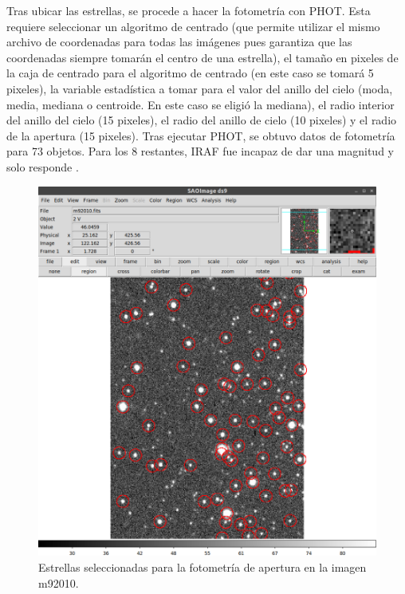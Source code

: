 \documentclass[12pt]{article}
\begin{document}
Tras ubicar las estrellas, se procede a hacer la fotometría con PHOT.
Esta requiere seleccionar un algoritmo de centrado (que permite utilizar el mismo archivo de coordenadas para todas las imágenes pues garantiza que las coordenadas siempre tomarán el centro de una estrella), el tamaño en pixeles de la caja de centrado para el algoritmo de centrado (en este caso se tomará 5 pixeles), la variable estadística a tomar para el valor del anillo del cielo (moda, media, mediana o centroide. En este caso se eligió la mediana), el radio interior del anillo del cielo (15 pixeles), el radio del anillo de cielo (10 pixeles) y el radio de la apertura (15 pixeles). 
Tras ejecutar PHOT, se obtuvo datos de fotometría para 73 objetos. Para los 8 restantes, IRAF fue incapaz de dar una magnitud y solo responde .


\begin{figure}[H]
   \includegraphics[scale=0.4]{im01.png}
  \caption{Estrellas seleccionadas para la fotometría de apertura en la imagen m92010.}
  \label{im1}
\end{figure}












%
\end{document}
